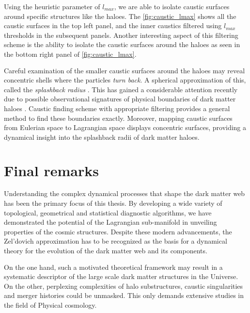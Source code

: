 Using the heuristic parameter of $l_{max}$, we are able to isolate caustic surfaces around specific structures like the haloes. The \autoref{fig:caustic_lmax} shows all the caustic surfaces in the top left panel, and the inner caustics filtered using $l_{max}$ thresholds in the subsequent panels. Another interesting aspect of this filtering scheme is the ability to isolate the caustic surfaces around the haloes as seen in the bottom right panel of \autoref{fig:caustic_lmax}. 


Careful examination of the smaller caustic surfaces around the haloes may reveal concentric shells where the particles {\it turn back}. A spherical approximation of this, called the {\it splashback radius} \citep{More2015}. This has gained a considerable attention recently due to possible observational signatures of physical boundaries of dark matter haloes \citep{Chang2017}. Caustic finding scheme with appropriate filtering provides a general method to find these boundaries exactly. Moreover, mapping caustic surfaces from Eulerian space to Lagrangian space displays concentric surfaces, providing a dynamical insight into the splashback radii of dark matter haloes. 



\section{Final remarks}

Understanding the complex dynamical processes that shape the dark matter web has been the primary focus of this thesis. By developing a wide variety of topological, geometrical and statistical diagnostic algorithms, we have demonstrated the potential of the Lagrangian sub-manifold in unveiling properties of the cosmic structures. Despite these modern advancements, the Zel'dovich approximation has to be recognized as the basis for a dynamical theory for the evolution of the dark matter web and its components. 

On the one hand, such a motivated theoretical framework may result in a systematic descriptor of the large scale dark matter structures in the Universe. On the other, perplexing complexities of halo substructures, caustic singularities and merger histories could be unmasked. This only demands extensive studies in the field of Physical cosmology.   


